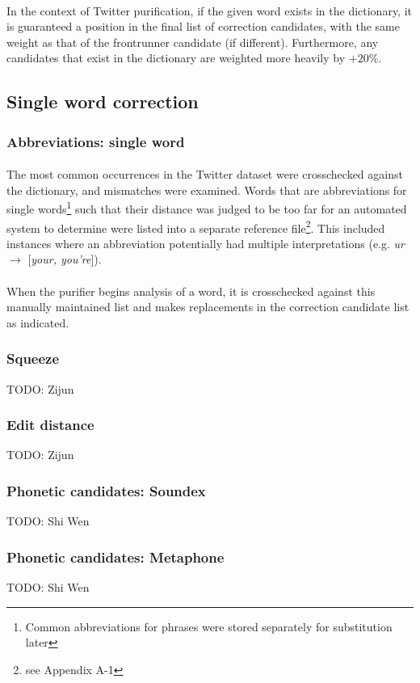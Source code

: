 \documentclass[twocolumn,10pt]{article}
\begin{document}
\paragraph{} In the context of Twitter purification, if the given word exists in the dictionary, it is guaranteed a position in the final list of correction candidates, with the same weight as that of the frontrunner candidate (if different). Furthermore, any candidates that exist in the dictionary are weighted more heavily by $+20\%$.
\subsection*{Single word correction}
\subsubsection*{Abbreviations: single word}
\paragraph{} The most common occurrences in the Twitter dataset were crosschecked against the dictionary, and mismatches were examined. Words that are abbreviations for single words\footnote{Common abbreviations for phrases were stored separately for substitution later} such that their distance was judged to be too far for an automated system to determine were listed into a separate reference file\footnote{see Appendix A-1}. This included instances where an abbreviation potentially had multiple interpretations (e.g. \textit{ur} $\rightarrow$ [\textit{your, you're}]).
\paragraph{} When the purifier begins analysis of a word, it is crosschecked against this manually maintained list and makes replacements in the correction candidate list as indicated.
\subsubsection*{Squeeze}
TODO: Zijun
\subsubsection*{Edit distance}
TODO: Zijun
\subsubsection*{Phonetic candidates: Soundex}
TODO: Shi Wen
\subsubsection*{Phonetic candidates: Metaphone}
TODO: Shi Wen
\end{document}
